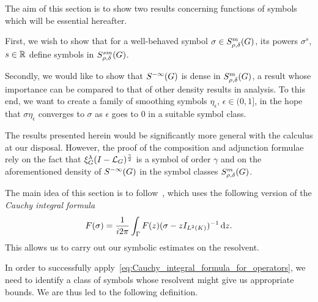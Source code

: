 The aim of this section is to show two results concerning functions of symbols which will be essential hereafter.

First, we wish to show that for a well-behaved symbol $\sigma \in S^{m}_{\rho, \delta}(G)$,
its powers $\sigma^s$, $s \in \mathbb{R}$ define symbols in $S^{s m}_{\rho, \delta}(G)$.

Secondly, we would like to show that ${S^{-\infty} (G)}$ is dense in $S^{m}_{\rho, \delta}(G)$,
a result whose importance can be compared to that of other density results in analysis.
To this end, we want to create a family of smoothing symbols $\eta_\epsilon$, $\epsilon \in (0, 1]$, in the hope
that $\sigma \eta_\epsilon$ converges to $\sigma$ as $\epsilon$ goes to $0$ in a suitable symbol class.

The results presented herein would be significantly more general with the calculus at our disposal.
However, the proof of the composition and adjunction formulae rely on the fact that $\xi^{\lambda}_{G} (I - {\mathcal{L}_{G}})^\frac{\gamma}{2}$ is a symbol of order $\gamma$
and on the aforementioned density of ${S^{-\infty} (G)}$ in the symbol classes $S^{m}_{\rho, \delta}(G)$.

The main idea of this section is to follow~\cite{RuzhanskyWirth14},
which uses the following version of the \emph{Cauchy integral formula}
\begin{align}
    F(\sigma) = \frac 1 {i 2 \pi} \int_\Gamma F(z) (\sigma - z{I_{{L^{2} (K)}}})^{-1} \,\mathrm{d} z.
    \label{eq:Cauchy_integral_formula_for_operators}
\end{align}
This allows us to carry out our symbolic estimates on the resolvent.

In order to successfully apply~\eqref{eq:Cauchy_integral_formula_for_operators},
we need to identify a class of symbols whose resolvent might give us appropriate bounds.
We are thus led to the following definition.

